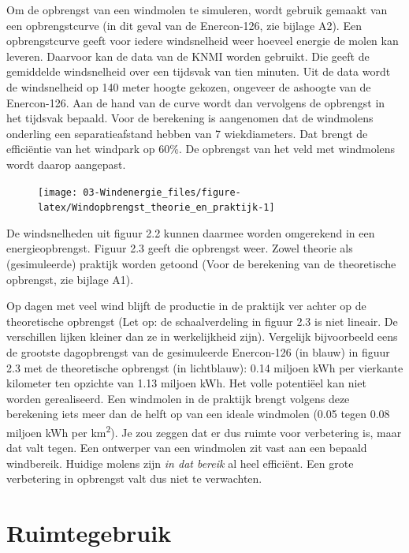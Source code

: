 \documentclass[
  11pt,
  a4paper,
]{book}
\begin{document}
Om de opbrengst van een windmolen te simuleren, wordt gebruik gemaakt van een opbrengstcurve (in dit geval van de Enercon-126, zie bijlage A2). Een opbrengstcurve geeft voor iedere windsnelheid weer hoeveel energie de molen kan leveren. Daarvoor kan de data van de KNMI worden gebruikt. Die geeft de gemiddelde windsnelheid over een tijdsvak van tien minuten. Uit de data wordt de windsnelheid op 140 meter hoogte gekozen, ongeveer de ashoogte van de Enercon-126. Aan de hand van de curve wordt dan vervolgens de opbrengst in het tijdsvak bepaald. Voor de berekening is aangenomen dat de windmolens onderling een separatieafstand hebben van 7 wiekdiameters. Dat brengt de efficiëntie van het windpark op 60\%. De opbrengst van het veld met windmolens wordt daarop aangepast.

\begin{figure}[t]

{\centering \texttt{[image: 03-Windenergie\_files/figure-latex/Windopbrengst\_theorie\_en\_praktijk-1]} 

}

\end{figure}

De windsnelheden uit figuur 2.2 kunnen daarmee worden omgerekend in een energieopbrengst. Figuur 2.3 geeft die opbrengst weer. Zowel theorie als (gesimuleerde) praktijk worden getoond (Voor de berekening van de theoretische opbrengst, zie bijlage A1).

Op dagen met veel wind blijft de productie in de praktijk ver achter op de theoretische opbrengst (Let op: de schaalverdeling in figuur 2.3 is niet lineair. De verschillen lijken kleiner dan ze in werkelijkheid zijn). Vergelijk bijvoorbeeld eens de grootste dagopbrengst van de gesimuleerde Enercon-126 (in blauw) in figuur 2.3 met de theoretische opbrengst (in lichtblauw): 0.14 miljoen kWh per vierkante kilometer ten opzichte van 1.13 miljoen kWh. Het volle potentiëel kan niet worden gerealiseerd. Een windmolen in de praktijk brengt volgens deze berekening iets meer dan de helft op van een ideale windmolen (0.05 tegen 0.08 miljoen kWh per km\textsuperscript{2}). Je zou zeggen dat er dus ruimte voor verbetering is, maar dat valt tegen. Een ontwerper van een windmolen zit vast aan een bepaald windbereik. Huidige molens zijn \emph{in dat bereik} al heel efficiënt. Een grote verbetering in opbrengst valt dus niet te verwachten.

\hypertarget{ruimtegebruik}{%
\section{Ruimtegebruik}\label{ruimtegebruik}}
\end{document}
